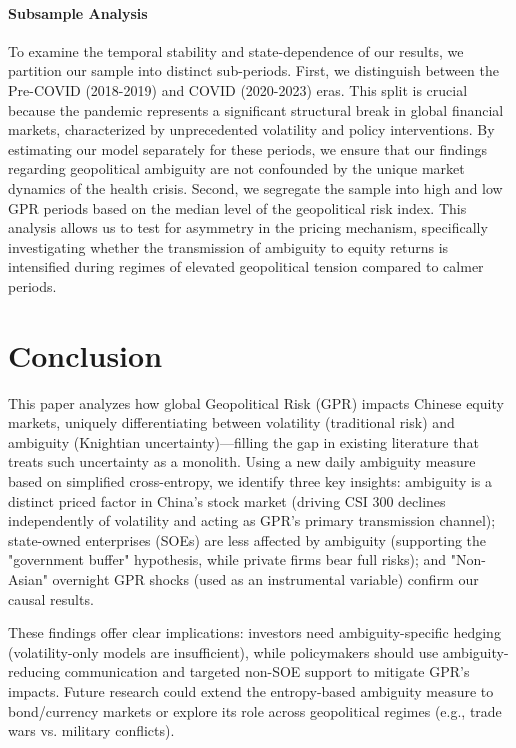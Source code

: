 \documentclass[preprint,12pt,authoryear]{elsarticle}
\begin{document}
\paragraph{Subsample Analysis} To examine the temporal stability and state-dependence of our results, we partition our sample into distinct sub-periods. First, we distinguish between the Pre-COVID (2018-2019) and COVID (2020-2023) eras. This split is crucial because the pandemic represents a significant structural break in global financial markets, characterized by unprecedented volatility and policy interventions. By estimating our model separately for these periods, we ensure that our findings regarding geopolitical ambiguity are not confounded by the unique market dynamics of the health crisis. Second, we segregate the sample into high and low GPR periods based on the median level of the geopolitical risk index. This analysis allows us to test for asymmetry in the pricing mechanism, specifically investigating whether the transmission of ambiguity to equity returns is intensified during regimes of elevated geopolitical tension compared to calmer periods.


\section{Conclusion}
\label{sec:conclusion}

This paper analyzes how global Geopolitical Risk (GPR) impacts Chinese equity markets, uniquely differentiating between volatility (traditional risk) and ambiguity (Knightian uncertainty)—filling the gap in existing literature that treats such uncertainty as a monolith. Using a new daily ambiguity measure based on simplified cross-entropy, we identify three key insights: ambiguity is a distinct priced factor in China’s stock market (driving CSI 300 declines independently of volatility and acting as GPR’s primary transmission channel); state-owned enterprises (SOEs) are less affected by ambiguity (supporting the "government buffer" hypothesis, while private firms bear full risks); and "Non-Asian" overnight GPR shocks (used as an instrumental variable) confirm our causal results.

These findings offer clear implications: investors need ambiguity-specific hedging (volatility-only models are insufficient), while policymakers should use ambiguity-reducing communication and targeted non-SOE support to mitigate GPR’s impacts. Future research could extend the entropy-based ambiguity measure to bond/currency markets or explore its role across geopolitical regimes (e.g., trade wars vs. military conflicts).
\end{document}
